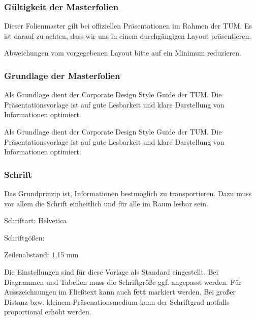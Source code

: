 
\begin{frame}
    \frametitle{Gültigkeit der Masterfolien}

Dieser Folienmaster gilt bei offiziellen Präsentationen im Rahmen der TUM. Es
ist darauf zu achten, dass wir uns in einem durchgängigen Layout präsentieren.

Abweichungen vom vorgegebenen Layout bitte auf ein Minimum reduzieren.

\end{frame}
\clearpage



\begin{frame}
    \frametitle{Grundlage der Masterfolien}

Als Grundlage dient der Corporate Design Style Guide der TUM.\newline
Die Präsentationsvorlage ist auf gute Lesbarkeit und klare Darstellung von
Informationen optimiert.

\end{frame}
\clearpage



\begin{frame}

Als Grundlage dient der Corporate Design Style Guide der TUM.\newline
Die Präsentationsvorlage ist auf gute Lesbarkeit und klare Darstellung von
Informationen optimiert.

\end{frame}
\clearpage


\begin{frame}
    \frametitle{Schrift}

Das Grundprinzip ist, Informationen bestmöglich zu transportieren. Dazu muss
vor allem die Schrift einheitlich und für alle im Raum lesbar sein.

Schriftart: Helvetica

Schriftgößen: \PraesentationBeispieleSchriftgroessen

Zeilenabstand: 1,15 mm

Die Einstellungen sind für diese Vorlage als Standard eingestellt. Bei
Diagrammen und Tabellen muss die Schriftgröße ggf. angepasst werden. Für
Ausszeichnungen im Fließtext kann auch \textbf{fett} markiert werden. Bei
großer Distanz bzw. kleinem Präsenationsmedium kann der Schriftgrad notfalls
proportional erhöht werden.

\end{frame}
\clearpage


